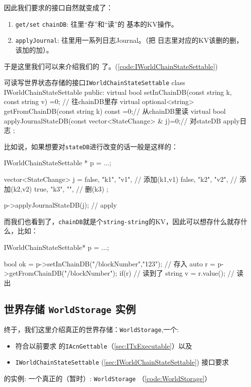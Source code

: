 因此我们要求的接口自然就变成了：

\begin{enumerate}
\item \texttt{get/set} \texttt{chainDB}: 往里“存”和“读”的
  基本的KV操作。
\item \texttt{applyJournal}: 往里用一系列日志Journal。（把
  日志里对应的KV该删的删，该加的加）。
\end{enumerate}

于是这里我们可以来介绍我们的 了。(\cref{code:IWorldChainStateSettable})

\begin{numberedc}{可读写世界状态存储的接口\texttt{IWorldChainStateSettable}}
{\label{code:IWorldChainStateSettable}}
  class IWorldChainStateSettable {
  public:
    virtual bool setInChainDB(const string k, const string v) =0; // 往chainDB里存
    virtual optional<string> getFromChainDB(const string k) const =0;// 从chainDB里读
    virtual bool applyJournalStateDB(const vector<StateChange> & j)=0;// 对stateDB apply日志
  };
\end{numberedc}

比如说，如果想要对\texttt{stateDB}进行改变的话一般是这样的：
\begin{simplec}
IWorldChainStateSettable * p = ...;

vector<StateChange> j = {
  {false, "k1", "v1"},          // 添加(k1,v1)
  {false, "k2", "v2"},          // 添加(k2,v2)
  {true, "k3", ""},             // 删(k3)
};

p->applyJournalStateDB(j);      // apply
\end{simplec}

而我们也看到了，\texttt{chainDB}就是个\texttt{string-string}的KV，因此可以想存什么就存什么，比如：
\begin{simplec}
IWorldChainStateSettable* p = ...;

bool ok = p->setInChainDB("/blockNumber","123"); // 存入
auto r = p->getFromChainDB("/blockNumber");
if(r)                           // 读到了
  string v = r.value(); // 读出
\end{simplec}

\subsection{世界存储 \texttt{WorldStorage} 实例}
\label{sec:world-storage}

终于，我们这里介绍真正的世界存储：\texttt{WorldStorage},一个:
\begin{itemize}
\item 符合以前要求 的\texttt{IAcnGettable}（\cref{sec:ITxExecutable}）以及
\item \texttt{IWorldChainStateSettable} (\cref{sec:IWorldChainStateSettable}) 接口要求
\end{itemize}
的实例: 一个真正的（暂时）: \texttt{WorldStorage}
（\cref{code:WorldStorage}）

